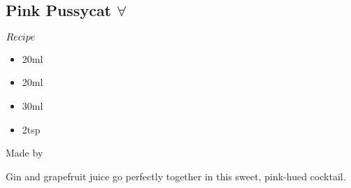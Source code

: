 \subsection{Pink Pussycat $\forall$}
\begin{itembox}[l]{\boldmath $Recipe$}
\begin{itemize}
\setlength{\parskip}{0cm}
\setlength{\itemsep}{0cm}
\item \gin 20ml
\item \pj 20ml
\item \gj 30ml
\item \gs 2tsp
\end{itemize}
\vspace{-4mm}
Made by \shake
\end{itembox}
Gin and grapefruit juice go perfectly together in this sweet, pink-hued cocktail.
